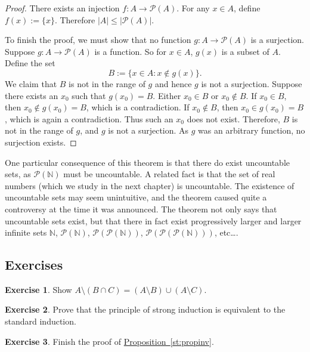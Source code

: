 \documentclass[12pt]{book}
\newcommand{\abs}[1]{\left\lvert {#1} \right\rvert}
\newcommand{\N}{{\mathbb{N}}}
\newcommand{\sP}{{\mathcal{P}}}
\theoremstyle{plain}
\theoremstyle{remark}
\theoremstyle{definition}
\theoremstyle{exercise}
\newtheorem{exercise}{Exercise}[section]
\theoremstyle{example}
\newcommand{\propref}[1]{\hyperref[#1]{Proposition~\ref*{#1}}}
\begin{document}
\begin{proof}
There exists an injection $f \colon A \to \sP(A)$.
For any $x \in A$, define $f(x) := \{ x \}$.  Therefore
$\abs{A} \leq \abs{\sP(A)}$.

To finish the proof, we must show that
no function $g \colon A \to \sP(A)$ is a surjection.
Suppose 
$g \colon A \to \sP(A)$ is a function.  So for $x \in A$,
$g(x)$ is a subset of $A$.  Define the set
\begin{equation*}
B := \{ x \in A : x \notin g(x) \} .
\end{equation*}
We claim that $B$ is not in the range of $g$ and hence $g$ is not a
surjection.  Suppose there exists an $x_0$ such that $g(x_0) = B$.
Either $x_0 \in B$ or $x_0 \notin B$.  If $x_0 \in B$, then $x_0 \notin
g(x_0) = B$, which is a contradiction.  If $x_0 \notin B$, then $x_0 \in
g(x_0) = B$, which is again a contradiction.  Thus such an $x_0$ does not
exist.  Therefore, $B$ is not in the range of $g$, and $g$ is not a
surjection.  As $g$ was an arbitrary function, no surjection exists.
\end{proof}

One particular consequence of this 
theorem is that there do exist uncountable sets,
as $\sP(\N)$ must be uncountable.
A related fact is that
the set of real numbers (which we study in the next chapter) is uncountable.
The existence of uncountable sets may seem unintuitive, and the theorem
caused quite a controversy at the time
it was announced.  The theorem not only says that uncountable sets exist,
but that there in fact exist progressively larger
and larger infinite sets $\N$, $\sP(\N)$,
$\sP(\sP(\N))$, $\sP(\sP(\sP(\N)))$, etc\ldots.

\subsection{Exercises}

\begin{exercise}
Show
$A \setminus (B \cap C) = (A \setminus B) \cup (A \setminus C)$.
\end{exercise}

\begin{exercise}
Prove that the principle of strong induction is equivalent to the standard
induction.
\end{exercise}

\begin{exercise}
Finish the proof of \propref{st:propinv}.
\end{exercise}
\end{document}
